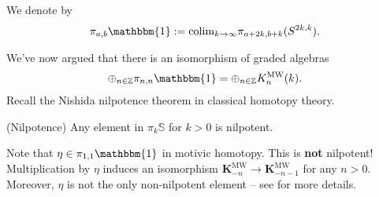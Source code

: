 \documentclass[11pt,openany]{book}
\providecommand{\MW}{\mathrm{MW}}
\providecommand{\KMW}{\mathbf{K}^\mathrm{MW}}
\begin{document}
\begin{notation} We denote by
\begin{align*}
    \pi_{a,b} \mathbbm{1} := \colim_{k\to \infty} \pi_{a + 2k, b + k} (S^{2k,k}).
\end{align*}
\end{notation}


We've now argued that there is an isomorphism of graded algebras 
\begin{align*}
    \oplus_{n\in \Z}\pi_{n,n} \mathbbm{1} = \oplus_{n\in \Z} K^\MW_n(k).
\end{align*}
%
Recall the Nishida nilpotence theorem in classical homotopy theory.

\begin{theorem} (Nilpotence) Any element in $\pi_k \mathbb{S}$ for $k>0$ is nilpotent.
\end{theorem}

Note that $\eta \in \pi_{1,1} \mathbbm{1}$ in motivic homotopy. This is \textbf{not} nilpotent! Multiplication by $\eta$ induces an isomorphism $\KMW_{-n} \to \KMW_{-n-1}$ for any $n>0$. Moreover, $\eta$ is not the only non-nilpotent element -- see \cite{GuillouIsaksen} for more details.




\printbibliography
\end{document}
